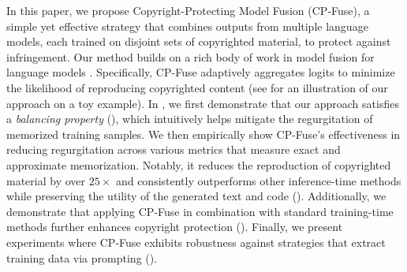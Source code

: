 In this paper, we propose Copyright-Protecting Model Fusion (CP-Fuse), a simple yet effective strategy that combines outputs from multiple language models, each trained on disjoint sets of copyrighted material, to protect against infringement. Our method builds on a rich body of work in model fusion for language models \citep{liu2021dexperts, wang2023fusing,wan2024knowledge}. Specifically, CP-Fuse adaptively aggregates logits to minimize the likelihood of reproducing copyrighted content (see  for an illustration of our approach on a toy example). In , we first demonstrate that our approach satisfies a \textit{balancing property} (), which intuitively helps mitigate the regurgitation of memorized training samples. We then empirically show CP-Fuse's effectiveness in reducing regurgitation across various metrics that measure exact and approximate memorization. Notably, it reduces the reproduction of copyrighted material by over $25\times$ and consistently outperforms other inference-time methods while preserving the utility of the generated text and code (). Additionally, we demonstrate that applying CP-Fuse in combination with standard training-time methods further enhances copyright protection (). Finally, we present experiments where CP-Fuse exhibits robustness against strategies that extract training data via prompting  ().


